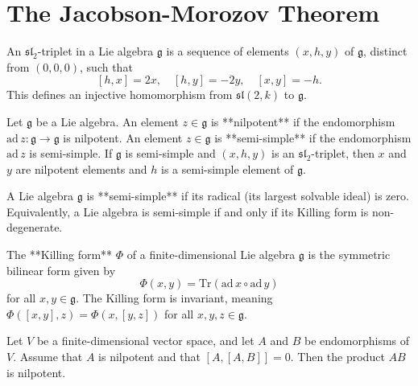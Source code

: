 \chapter{The Jacobson-Morozov Theorem}

\begin{definition}
    \label{def:sl2_triplet}
    An $\mathfrak{sl}_2$-triplet in a Lie algebra $\mathfrak{g}$ is a sequence of elements $(x, h, y)$ of $\mathfrak{g}$, distinct from $(0, 0, 0)$, such that
    $$[h, x] = 2x, \quad [h, y] = -2y, \quad [x, y] = -h.$$
    This defines an injective homomorphism from $\mathfrak{sl}(2, k)$ to $\mathfrak{g}$.
\end{definition}

\begin{definition}
    \label{def:nilpotent_and_semi_simple_elements}
    Let $\mathfrak{g}$ be a Lie algebra. An element $z \in \mathfrak{g}$ is **nilpotent** if the endomorphism $\mathrm{ad}\,z: \mathfrak{g} \to \mathfrak{g}$ is nilpotent. An element $z \in \mathfrak{g}$ is **semi-simple** if the endomorphism $\mathrm{ad}\,z$ is semi-simple. If $\mathfrak{g}$ is semi-simple and $(x, h, y)$ is an $\mathfrak{sl}_2$-triplet, then $x$ and $y$ are nilpotent elements and $h$ is a semi-simple element of $\mathfrak{g}$.
\end{definition}

\begin{definition}
    \label{def:semi_simple_lie_algebra}
    A Lie algebra $\mathfrak{g}$ is **semi-simple** if its radical (its largest solvable ideal) is zero. Equivalently, a Lie algebra is semi-simple if and only if its Killing form is non-degenerate.
\end{definition}

\begin{definition}
    \label{def:killing_form}
    The **Killing form** $\Phi$ of a finite-dimensional Lie algebra $\mathfrak{g}$ is the symmetric bilinear form given by
    $$\Phi(x, y) = \mathrm{Tr}(\mathrm{ad}\,x \circ \mathrm{ad}\,y)$$
    for all $x, y \in \mathfrak{g}$. The Killing form is invariant, meaning $\Phi([x, y], z) = \Phi(x, [y, z])$ for all $x, y, z \in \mathfrak{g}$.
\end{definition}

\begin{lemma}
    \label{lem:nilpotency_of_product}
    Let $V$ be a finite-dimensional vector space, and let $A$ and $B$ be endomorphisms of $V$. Assume that $A$ is nilpotent and that $[A, [A, B]] = 0$. Then the product $AB$ is nilpotent.
\end{lemma}

